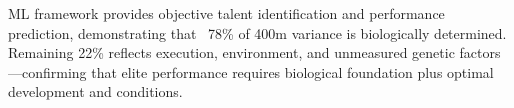 ML framework provides objective talent identification and performance prediction, demonstrating that ~78\% of 400m variance is biologically determined. Remaining 22\% reflects execution, environment, and unmeasured genetic factors—confirming that elite performance requires biological foundation plus optimal development and conditions.
